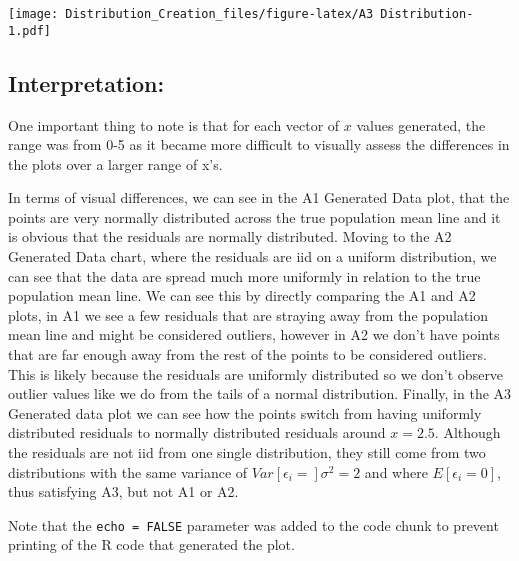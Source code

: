 \documentclass[
]{article}
\begin{document}
\texttt{[image: Distribution\_Creation\_files/figure-latex/A3 Distribution-1.pdf]}

\hypertarget{interpretation}{%
\subsection{Interpretation:}\label{interpretation}}

One important thing to note is that for each vector of \(x\) values
generated, the range was from 0-5 as it became more difficult to
visually assess the differences in the plots over a larger range of x's.

In terms of visual differences, we can see in the A1 Generated Data
plot, that the points are very normally distributed across the true
population mean line and it is obvious that the residuals are normally
distributed. Moving to the A2 Generated Data chart, where the residuals
are iid on a uniform distribution, we can see that the data are spread
much more uniformly in relation to the true population mean line. We can
see this by directly comparing the A1 and A2 plots, in A1 we see a few
residuals that are straying away from the population mean line and might
be considered outliers, however in A2 we don't have points that are far
enough away from the rest of the points to be considered outliers. This
is likely because the residuals are uniformly distributed so we don't
observe outlier values like we do from the tails of a normal
distribution. Finally, in the A3 Generated data plot we can see how the
points switch from having uniformly distributed residuals to normally
distributed residuals around \(x=2.5\). Although the residuals are not
iid from one single distribution, they still come from two distributions
with the same variance of \(Var[\epsilon_i=]\sigma^2=2\) and where
\(E[\epsilon_i=0]\), thus satisfying A3, but not A1 or A2.

Note that the \texttt{echo\ =\ FALSE} parameter was added to the code
chunk to prevent printing of the R code that generated the plot.
\end{document}
